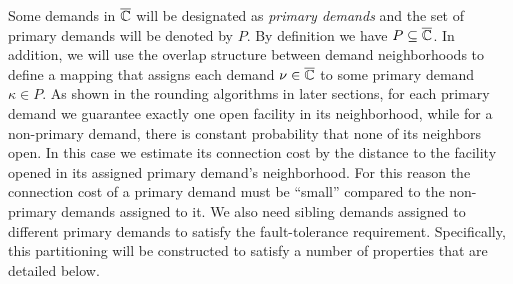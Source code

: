 \documentclass[oneside,final]{ucr}
\begin{document}
Some demands in $\overline{\mathbb{C}}$ will be designated as
\emph{primary demands} and the set of primary demands will
be denoted by $P$. By definition we have $P\subseteq \overline{\mathbb{C}}$.
 In addition, we will use the overlap
structure between demand neighborhoods to define a mapping
that assigns each demand $\nu\in\overline{\mathbb{C}}$ to some primary
demand $\kappa\in P$. As shown in the rounding algorithms in
later sections, for each primary demand we guarantee exactly
one open facility in its neighborhood, while for a
non-primary demand, there is constant probability that none
of its neighbors open. In this case we estimate its
connection cost by the distance to the facility opened in
its assigned primary demand's neighborhood. For this reason
the connection cost of a primary demand must be ``small''
compared to the non-primary demands assigned to it. We also
need sibling demands assigned to different primary demands to satisfy
the fault-tolerance requirement. Specifically, this
partitioning will be constructed to satisfy a number of
properties that are detailed below.
%
\end{document}
